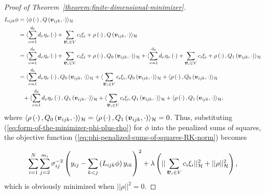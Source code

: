 \begin{proof}[Proof of Theorem~\ref{theorem:finite-dimensional-minimizer}]
\begin{align*}
L_{ijk} \phi &= \langle \phi\left(\cdot\right), Q\left(\mbox{\boldmath $v$}_{ijk}, \cdot\right) \rangle_{\mathcal{H}} \\
&=  \langle  \sum_{\nu = 1}^{d_0} d_\nu \eta_\nu\left(\cdot\right) + \sum_{\mbox{\boldmath $v$}_{i} \in V} c_i \xi_i + \rho\left(\cdot\right), Q\left(\mbox{\boldmath $v$}_{ijk}, \cdot\right) \rangle_{\mathcal{H}} \\
&= \langle  \sum_{\nu = 1}^{d_0} d_\nu \eta_\nu\left(\cdot\right) + \sum_{\mbox{\boldmath $v$}_{i} \in V} c_i \xi_i + \rho\left(\cdot\right), Q_0\left(\mbox{\boldmath $v$}_{ijk}, \cdot\right) \rangle_{\mathcal{H}} + \langle \sum_{\nu = 1}^{d_0} d_\nu \eta_\nu\left(\cdot\right) + \sum_{\mbox{\boldmath $v$}_{i} \in V} c_i \xi_i + \rho\left(\cdot\right), Q_1\left(\mbox{\boldmath $v$}_{ijk}, \cdot\right) \rangle_{\mathcal{H}} \\
&=  \langle  \sum_{\nu = 1}^{d_0} d_\nu \eta_\nu\left(\cdot\right) ,  Q_0\left(\mbox{\boldmath $v$}_{ijk}, \cdot\right) \rangle_{\mathcal{H}} +  \langle   \sum_{\mbox{\boldmath $v$}_{i} \in V} c_i \xi_i  ,  Q_0\left(\mbox{\boldmath $v$}_{ijk}, \cdot\right) \rangle_{\mathcal{H}} + \langle \rho\left(\cdot\right), Q_0\left(\mbox{\boldmath $v$}_{ijk}, \cdot\right) \rangle_{\mathcal{H}} \\ 
&\phantom{=} + \langle  \sum_{\nu = 1}^{d_0} d_\nu \eta_\nu\left(\cdot\right) ,  Q_1\left(\mbox{\boldmath $v$}_{ijk}, \cdot\right) \rangle_{\mathcal{H}} +  \langle   \sum_{\mbox{\boldmath $v$}_{i} \in V} c_i \xi_i  ,  Q_1\left(\mbox{\boldmath $v$}_{ijk}, \cdot\right) \rangle_{\mathcal{H}} + \langle \rho\left(\cdot\right), Q_1\left(\mbox{\boldmath $v$}_{ijk}, \cdot\right) \rangle_{\mathcal{H}}, 
\end{align*}
\noindent
where $\langle \rho\left(\cdot\right), Q_0\left(\mbox{\boldmath $v$}_{ijk}, \cdot\right) \rangle_{\mathcal{H}} = \langle \rho\left(\cdot\right), Q_1\left(\mbox{\boldmath $v$}_{ijk}, \cdot\right) \rangle_{\mathcal{H}} = 0$. Thus, substituting (\ref{eq:form-of-the-minimizer-phi-plus-rho}) for $\phi$ into the penalized sums of squares, the objective function (\ref{eq:phi-penalized-sums-of-squares-RK-norm}) becomes

\begin{equation} \label{eq:phi-penalized-sums-of-squares-RK-norm}
\sum_{i=1}^N \sum_{j=2}^{m_i} \sigma^{-2}_{ij}\left( y_{ij} - \sum_{k<j}\left( L_{ijk}\phi\right) y_{ik}  \right)^2 + \lambda \left(\vert \vert \sum_{\mbox{\boldmath $v$}_i \in V} c_i \xi_i \vert \vert_{\mathcal{H}}^2 + \vert \vert \rho \vert \vert_{\mathcal{H}}^2\right),
\end{equation} 
\noindent
which is obviously minimized when $\vert \vert \rho \vert \vert^2 = 0$.
 
\end{proof}
 
